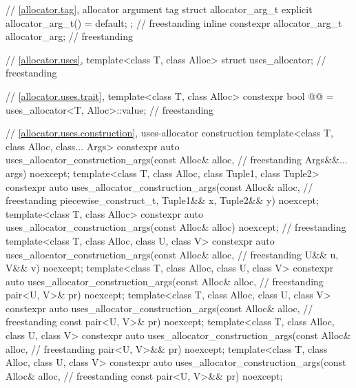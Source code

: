 \begin{codeblock}
{  // \ref{allocator.tag}, allocator argument tag
  struct allocator_arg_t { explicit allocator_arg_t() = default; };                 // freestanding
  inline constexpr allocator_arg_t allocator_arg{};                                 // freestanding

  // \ref{allocator.uses}, 
  template<class T, class Alloc> struct uses_allocator;                             // freestanding

  // \ref{allocator.uses.trait}, 
  template<class T, class Alloc>
    constexpr bool @@ = uses_allocator<T, Alloc>::value;              // freestanding

  // \ref{allocator.uses.construction}, uses-allocator construction
  template<class T, class Alloc, class... Args>
    constexpr auto uses_allocator_construction_args(const Alloc& alloc,             // freestanding
                                                    Args&&... args) noexcept;
  template<class T, class Alloc, class Tuple1, class Tuple2>
    constexpr auto uses_allocator_construction_args(const Alloc& alloc,             // freestanding
                                                    piecewise_construct_t,
                                                    Tuple1&& x, Tuple2&& y) noexcept;
  template<class T, class Alloc>
    constexpr auto uses_allocator_construction_args(const Alloc& alloc) noexcept;   // freestanding
  template<class T, class Alloc, class U, class V>
    constexpr auto uses_allocator_construction_args(const Alloc& alloc,             // freestanding
                                                    U&& u, V&& v) noexcept;
  template<class T, class Alloc, class U, class V>
    constexpr auto uses_allocator_construction_args(const Alloc& alloc,             // freestanding
                                                    pair<U, V>& pr) noexcept;
  template<class T, class Alloc, class U, class V>
    constexpr auto uses_allocator_construction_args(const Alloc& alloc,             // freestanding
                                                    const pair<U, V>& pr) noexcept;
  template<class T, class Alloc, class U, class V>
    constexpr auto uses_allocator_construction_args(const Alloc& alloc,             // freestanding
                                                    pair<U, V>&& pr) noexcept;
  template<class T, class Alloc, class U, class V>
    constexpr auto uses_allocator_construction_args(const Alloc& alloc,             // freestanding
                                                    const pair<U, V>&& pr) noexcept;
}
\end{codeblock}
